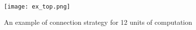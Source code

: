 \begin{figure}[h]
	\centering	
	\texttt{[image: ex\_top.png]}
	\caption{An example of connection strategy for 12 units of computation}\label{fig:ex_conn}
\end{figure}

%
%
%

